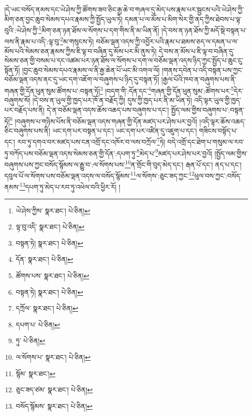 །དེ་ཡང་བསོད་ནམས་དང་ཡེ་ཤེས་ཀྱི་ཚོགས་ཟབ་ཅིང་རྒྱ་ཆེ་བ་གཞལ་དུ་མེད་པས་རྣམ་པར་སྦྱངས་པའི་ཡེ་ཤེས་ཀྱི་མིག་ཅན་བྱང་ཆུབ་སེམས་དཔའ་རྣམས་ཀྱི་སྤྱོད་ཡུལ་ཏེ། དམན་པ་ལ་མོས་པ་མིག་སེར་གྱི་ནད་ཀྱིས་ཐེབས་པ་ལྟ་བུའི་:ཡེ་ཤེས་ཀྱི་\footnote{ཡེ་ཤེས་ཀྱིས་  སྣར་ཐང་།  པེ་ཅིན། }མིག་ཅན་ཉན་ཐོས་ལ་སོགས་པ་དག་གིས་ནི་མ་ཡིན་ནོ། །དེ་བས་ན་ཉན་ཐོས་ཀྱི་མདོ་སྡེ་བསྟན་པ་ལས་ནི་རྣམ་པ་འདི་:ལྟ་བུ་\footnote{ལྟ་བུ་འདི་  སྣར་ཐང་།  པེ་ཅིན། }མ་གསུངས་ཏེ། བཅོམ་ལྡན་འདས་ཀྱི་འབྱོར་པའི་རྣམ་པ་ཐམས་ཅད་ལ་དམན་པ་ལ་མོས་པའི་སེམས་ཅན་རྣམས་ཀྱིས་ཇི་ལྟ་བ་བཞིན་དུ་མོས་པར་མི་ནུས་ཏེ། དེ་བས་ན་མོས་པ་ཇི་ལྟ་བ་བཞིན་དུ་སེམས་ཅན་གྱི་བསམ་པ་དང་འཚམ་པར་ཉན་ཐོས་ལ་སོགས་པ་དག་ལ་བཅོམ་ལྡན་འདས་ཉིད་ཀྱང་སྤྱོད་པ་ཆུང་ངུ་སྟོན་ཏོ། །བྱང་ཆུབ་སེམས་དཔའ་རྣམས་ལ་ནི་རྒྱ་ཆེན་པོ་ཡང་མི་འགལ་ལོ། །གནས་དབེན་པ་འདི་བསྟན་པས་ཀྱང་བཅོམ་ལྡན་འདས་ནང་དུ་ཡང་དག་འཇོག་ལ་བཞུགས་པ་ཉིད་དུ་བསྟན་ཏོ། །རྒྱལ་པོའི་ཁབ་ན་བཞུགས་པས་ནི་གཞན་གྱི་དོན་ཕུན་སུམ་ཚོགས་པ་:བསྟན་ཏོ།\footnote{བསྟན་ཏེ།  སྣར་ཐང་།  པེ་ཅིན། } །བདག་གི་:དོན་དང་\footnote{དོན་  སྣར་ཐང་།  པེ་ཅིན། }གཞན་གྱི་དོན་ཕུན་སུམ་:ཚོགས་པར་\footnote{ཚོགས་པས་  སྣར་ཐང་།  པེ་ཅིན། }དེར་བཞུགས་སོ། །དེ་བས་ན་ཡུལ་གྱི་ཁྱད་པར་ཁོ་ན་བརྗོད་ཀྱི། དུས་ཀྱི་ཁྱད་པར་ནི་མ་ཡིན་ཏེ། འདི་ལྟར་ཡུལ་གྱི་ཁྱད་པར་བརྗོད་པས་ནི། དེ་ན་བཅོམ་ལྡན་འདས་ཆོས་འཆད་པས་བཞུགས་པ་དང་། སྤྱོད་ལམ་གྱིས་བཞུགས་པ་:བསྟན་ཏོ།\footnote{བསྟན་ཏེ།  སྣར་ཐང་།  པེ་ཅིན། } །བཞུགས་པ་གཉིས་པོས་ནི་བཅོམ་ལྡན་འདས་གཞན་གྱི་དོན་མཛད་པར་ཤེས་པར་བྱའོ། །འདི་ལྟར་ཆོས་འཆད་ཅིང་བཞུགས་པས་ནི། ཡང་དག་པར་བསྟན་པ་དང་། ཡང་དག་པར་འཛིན་དུ་འཇུག་པ་དང་། གཟིངས་བསྟོད་པ་དང་། རབ་ཏུ་དགའ་བར་མཛད་པས་ངན་འགྲོ་དང་འཁོར་བ་ལས་བཀྲོལ་\footnote{དཀྲོལ་  སྣར་ཐང་།  པེ་ཅིན། }ཏེ། བདེ་འགྲོ་དང་ཐེག་པ་གསུམ་ལ་རབ་ཏུ་བཀོད་པས་བཅོམ་ལྡན་འདས་སེམས་ཅན་གྱི་དོན་:དཔག་ཏུ་\footnote{དཔག་པ་  པེ་ཅིན། }མེད་པ་\footnote{ཏུ་  པེ་ཅིན། }མཛད་པར་ཤེས་པར་བྱའོ། །སྤྱོད་ལམ་གྱིས་བཞུགས་པས་ཀྱང་བསོད་སྙོམས་ལ་རྒྱུ་བ་:ལ་སོགས་པས་\footnote{ལ་སོགས་པ་  སྣར་ཐང་།  པེ་ཅིན། }ན་གྲོང་གི་བུད་མེད་དང་། རྒན་པོ་དང་། ནད་པ་དང་། དབུལ་པོ་ལ་སོགས་པས་བཅོམ་ལྡན་འདས་ལ་བསོད་སྙོམས་\footnote{སྙོམ་  སྣར་ཐང་། }ལ་སོགས་:ཅུང་ཟད་ཀྱང་\footnote{ཅུང་ཟད་ཙམ་  སྣར་ཐང་།  པེ་ཅིན། }ཕུལ་བས་ཀྱང་:བསོད་ནམས་\footnote{བསོད་སྙོམས་  སྣར་ཐང་།  པེ་ཅིན། }དཔག་ཏུ་མེད་པ་རབ་ཏུ་འཕེལ་བའི་ཕྱིར་རོ། །
